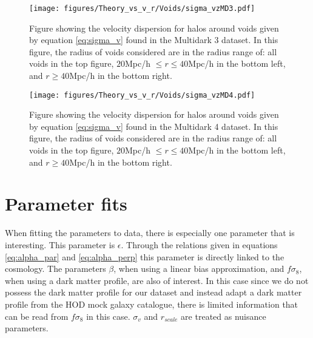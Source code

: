 \begin{figure}[H]
    \texttt{[image: figures/Theory\_vs\_v\_r/Voids/sigma\_vzMD3.pdf]}
    \caption{Figure showing the velocity dispersion for halos around voids given by equation \ref{eq:sigma_v} found in the Multidark 3 dataset. In this figure, the radius of voids considered are in the radius range of: all voids in the top figure, $20$Mpc/h $\leq r\leq 40$Mpc/h in the bottom left, and $r\geq 40$Mpc/h in the bottom right.}
    \label{fig:sigmavMD3}
\end{figure}

\begin{figure}[H]
    \texttt{[image: figures/Theory\_vs\_v\_r/Voids/sigma\_vzMD4.pdf]}
    \caption{Figure showing the velocity dispersion for halos around voids given by equation \ref{eq:sigma_v} found in the Multidark 4 dataset. In this figure, the radius of voids considered are in the radius range of: all voids in the top figure, $20$Mpc/h $\leq r\leq 40$Mpc/h in the bottom left, and $r\geq 40$Mpc/h in the bottom right.}
    \label{fig:sigmavMD4}
\end{figure}
\section{Parameter fits}
When fitting the parameters to data, there is especially one parameter that is interesting. This parameter is $\epsilon$. Through the relations given in 
equations \ref{eq:alpha_par} and \ref{eq:alpha_perp} this parameter is directly linked to the cosmology. The parameters $\beta$, when using a linear bias approximation, and $f\sigma_8$,
when using a dark matter profile, are also of interest. In this case since we do not possess the dark matter profile for our dataset and instead adapt a dark matter profile from the HOD mock galaxy catalogue, there is limited information that can be read from $f\sigma_8$ in this case. $\sigma_v$ and $r_{scale}$ are treated as nuisance parameters.

